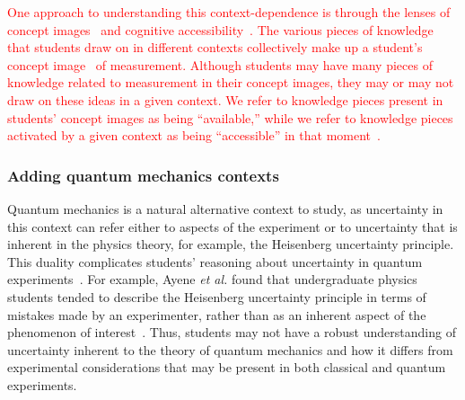 \documentclass[english,aps,prstper,reprint,showpacs,longbibliography,superscriptaddress,nofootinbib]{revtex4-2}
\begin{document}
\textcolor{red}{One approach to understanding this context-dependence is through the lenses of concept images~\cite{Tall1981,Schermerhorn2021} and cognitive accessibility~\cite{Heckler2018}. The various pieces of knowledge~\cite{Hammer2000} that students draw on in different contexts collectively make up a student's concept image~\cite{Tall1981,Schermerhorn2021} of measurement. Although students may have many pieces of knowledge related to measurement in their concept images, they may or may not draw on these ideas in a given context. We refer to knowledge pieces present in students' concept images as being ``available,'' while we refer to knowledge pieces activated by a given context as being ``accessible'' in that moment~\cite{Heckler2018}.}

\subsubsection{Adding quantum mechanics contexts}

Quantum mechanics is a natural alternative context to study, as uncertainty in this context can refer either to aspects of the experiment or to uncertainty that is inherent in the physics theory, for example, the Heisenberg uncertainty principle. This duality complicates students' reasoning about uncertainty in quantum experiments~\cite{Ayene2011,KrijtenburgLewerissa2017,Singh2015,Zhu2012a,Bouchee2022,Johnston1998}. For example, Ayene \textit{et al.} found that undergraduate physics students tended to describe the Heisenberg uncertainty principle in terms of mistakes made by an experimenter, rather than as an inherent aspect of the phenomenon of interest~\cite{Ayene2011}. Thus, students may not have a robust understanding of uncertainty inherent to the theory of quantum mechanics and how it differs from experimental considerations that may be present in both classical and quantum experiments. 


\end{document}
